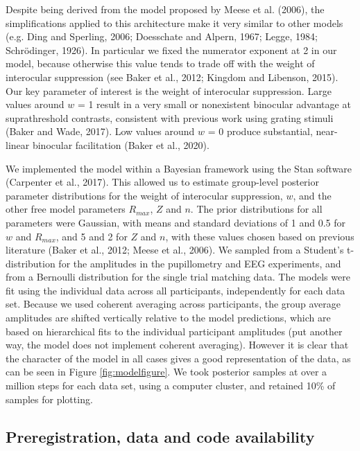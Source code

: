 \documentclass[
]{article}
\begin{document}
Despite being derived from the model proposed by Meese et al. (2006), the simplifications applied to this architecture make it very similar to other models (e.g. Ding and Sperling, 2006; Doesschate and Alpern, 1967; Legge, 1984; Schrödinger, 1926). In particular we fixed the numerator exponent at 2 in our model, because otherwise this value tends to trade off with the weight of interocular suppression (see Baker et al., 2012; Kingdom and Libenson, 2015). Our key parameter of interest is the weight of interocular suppression. Large values around \(w\) = 1 result in a very small or nonexistent binocular advantage at suprathreshold contrasts, consistent with previous work using grating stimuli (Baker and Wade, 2017). Low values around \(w\) = 0 produce substantial, near-linear binocular facilitation (Baker et al., 2020).

We implemented the model within a Bayesian framework using the Stan software (Carpenter et al., 2017). This allowed us to estimate group-level posterior parameter distributions for the weight of interocular suppression, \(w\), and the other free model parameters \(R_{max}\), \(Z\) and \(n\). The prior distributions for all parameters were Gaussian, with means and standard deviations of 1 and 0.5 for \(w\) and \(R_{max}\), and 5 and 2 for \(Z\) and \(n\), with these values chosen based on previous literature (Baker et al., 2012; Meese et al., 2006). We sampled from a Student's t-distribution for the amplitudes in the pupillometry and EEG experiments, and from a Bernoulli distribution for the single trial matching data. The models were fit using the individual data across all participants, independently for each data set. Because we used coherent averaging across participants, the group average amplitudes are shifted vertically relative to the model predictions, which are based on hierarchical fits to the individual participant amplitudes (put another way, the model does not implement coherent averaging). However it is clear that the character of the model in all cases gives a good representation of the data, as can be seen in Figure \ref{fig:modelfigure}. We took posterior samples at over a million steps for each data set, using a computer cluster, and retained 10\% of samples for plotting.

\hypertarget{preregistration-data-and-code-availability}{%
\subsection{Preregistration, data and code availability}\label{preregistration-data-and-code-availability}}
\end{document}
